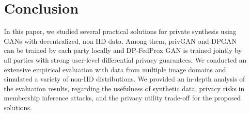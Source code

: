\documentclass[conference]{IEEEtran}
\begin{document}











\section{Conclusion}

In this paper, we studied several practical solutions for private synthesis using GANs with decentralized, non-IID data.
Among them, privGAN and DPGAN can be trained by each party locally and DP-FedProx GAN is trained jointly by all parties with strong user-level differential privacy guarantees. We conducted an extensive empirical evaluation with data from multiple image domains and simulated a variety of non-IID distributions. %
We provided an in-depth analysis of the evaluation results, regarding the usefulness of synthetic data, privacy risks in membership inference attacks, and the privacy utility trade-off for the proposed solutions. 
\end{document}
